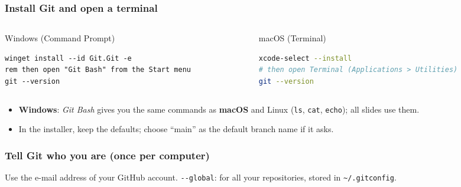 \documentclass[aspectratio=169,10pt,compress]{beamer}
\newcommand{\win}{\textbf{Windows}}
\newcommand{\mac}{\textbf{macOS}}
\begin{document}
\begin{frame}[t,fragile] \frametitle{Install Git and open a terminal}
  \begin{columns}[T]
    \begin{column}{0.48\textwidth}
      \begin{block}{Windows (Command Prompt)}


\begin{lstlisting}[style=codesnippet, language={}, basicstyle=\ttfamily\scriptsize]
winget install --id Git.Git -e
rem then open "Git Bash" from the Start menu
git --version
\end{lstlisting}


      \end{block}
    \end{column}
    \begin{column}{0.48\textwidth}
      \begin{block}{macOS (Terminal)}


\begin{lstlisting}[style=codesnippet, language=bash, basicstyle=\ttfamily\scriptsize]
xcode-select --install
# then open Terminal (Applications > Utilities)
git --version
\end{lstlisting}


      \end{block}
    \end{column}
  \end{columns}

  \begin{itemize}\small
    \item \win: \emph{Git Bash} gives you the same commands as \mac{} and Linux (\texttt{ls}, \texttt{cat}, \texttt{echo}); all slides use them.
    \item In the installer, keep the defaults; choose ``main'' as the default branch name if it asks.
  \end{itemize}
\end{frame}




\begin{frame}[t,fragile] \frametitle{Tell Git who you are (once per computer)}

  \vspace{0.1em}
  \small
  Use the e-mail address of your GitHub account. \texttt{-{}-global}: for all your repositories, stored in \texttt{\textasciitilde/.gitconfig}.
\end{frame}
\end{document}

